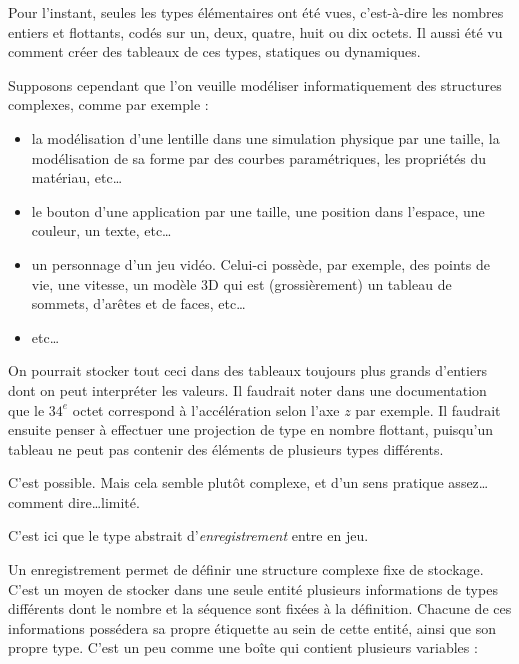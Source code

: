 \documentclass[../../../main.tex]{subfiles}
\begin{document}
Pour l'instant, seules les types élémentaires ont été vues, c'est-à-dire les nombres entiers et flottants, codés sur un, deux, quatre, huit ou dix octets. Il aussi été vu comment créer des tableaux de ces types, statiques ou dynamiques.
 
Supposons cependant que l'on veuille modéliser informatiquement des structures complexes, comme par exemple :
\begin{itemize}
	\item la modélisation d'une lentille dans une simulation physique par une taille, la modélisation de sa forme par des courbes paramétriques, les propriétés du matériau, etc\dots
	\item le bouton d'une application par une taille, une position dans l'espace, une couleur, un texte, etc\dots
	\item un personnage d'un jeu vidéo. Celui-ci possède, par exemple, des points de vie, une vitesse, un modèle 3D qui est (grossièrement) un tableau de sommets, d'arêtes et de faces, etc\dots
	\item etc\dots
\end{itemize}
On pourrait stocker tout ceci dans des tableaux toujours plus grands d'entiers dont on peut interpréter les valeurs. 
Il faudrait noter dans une documentation que le $34^e$ octet correspond à l'accélération selon l'axe $z$ par exemple. Il faudrait ensuite penser à effectuer une projection de type en nombre flottant, puisqu'un tableau ne peut pas contenir des éléments de plusieurs types différents.
 
C'est possible. Mais cela semble plutôt complexe, et d'un sens pratique assez\dots comment dire\dots limité.
 
C'est ici que le type abstrait d'\textit{enregistrement} entre en jeu.

Un enregistrement permet de définir une structure complexe fixe de stockage. C'est un moyen de stocker dans une seule entité plusieurs informations de types différents dont le nombre et la séquence sont fixées à la définition. Chacune de ces informations possédera sa propre étiquette au sein de cette entité, ainsi que son propre type. C'est un peu comme une boîte qui contient plusieurs variables : 

\begin{minipage}{\textwidth}
	\begin{center}
		
	\end{center}
\end{minipage}
\end{document}
